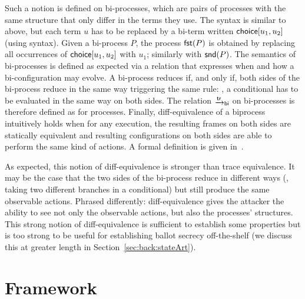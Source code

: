 Such a notion is defined on bi-processes, which are pairs of processes
with the same structure that only differ in the terms
they use.
The syntax is similar to above,
but each term $u$ has to be replaced by
a bi-term written $\mathsf{choice}[u_1,u_2]$ (using \proverif syntax).
Given a bi-process $P$, the process $\mathsf{fst}(P)$ is obtained by replacing
all occurrences of $\mathsf{choice}[u_1,u_2]$ with $u_1$; similarly with $\mathsf{snd}(P)$.
%
The semantics of bi-processes is defined as expected via a relation
that expresses when  and how a bi-configuration may evolve.
A bi-process reduces if, and only if,
both sides of the bi-process 
reduce in the same way triggering the same rule: \eg,
a conditional has to be evaluated in the same way on both sides.
The relation $\sint{\tr}_{\mathsf{bi}}$
on bi-processes is therefore defined as for processes.
Finally, diff-equivalence of a biprocess intuitively holds
when for any execution, the
resulting frames on both sides are statically equivalent and
resulting configurations  on both sides are able to perform the same kind of actions.
A formal definition is given in~.



As expected, this notion of diff-equivalence is stronger than
trace equivalence.
It may be the case that the 
two sides of the bi-process reduce in different
ways (\eg, taking two different branches in a conditional) but still
produce the same observable actions.
Phrased differently: diff-equivalence gives the attacker the ability to
see not only
the observable actions, but also the processes' structures.
This strong notion of diff-equivalence is sufficient to establish 
some properties %
but is too strong to be useful for
establishing ballot secrecy off-the-shelf
(we discuss this at greater length in Section~\ref{sec:back:stateArt}).




\section{Framework}
\label{sec:class}

